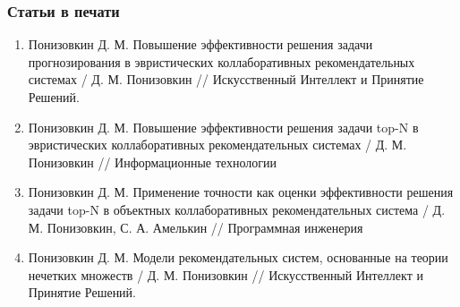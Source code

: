 \documentclass[10pt,xcolor={usenames,dvipsnames}]{beamer}
\theoremstyle{break}
\begin{document}
\begin{frame}
  \frametitle{Статьи в печати}
  \scriptsize{
    \begin{enumerate}
    \item Понизовкин Д. М. Повышение эффективности решения задачи прогнозирования в эвристических коллаборативных рекомендательных системах / Д. М. Понизовкин //
      Искусственный Интеллект и Принятие Решений.
    \item Понизовкин Д. М. Повышение эффективности решения задачи top-N в эвристических коллаборативных рекомендательных системах / Д. М. Понизовкин // 
      Информационные технологии
    \item Понизовкин Д. М. Применение точности как оценки эффективности решения задачи top-N в объектных коллаборативных рекомендательных система / 
      Д. М. Понизовкин, С. А. Амелькин // Программная инженерия
    \item Понизовкин Д. М. Модели рекомендательных систем, основанные на теории нечетких множеств / Д. М. Понизовкин // Искусственный Интеллект и Принятие Решений.
    \end{enumerate}
  }
\end{frame}

\frame{\titlepage}
\end{document}
